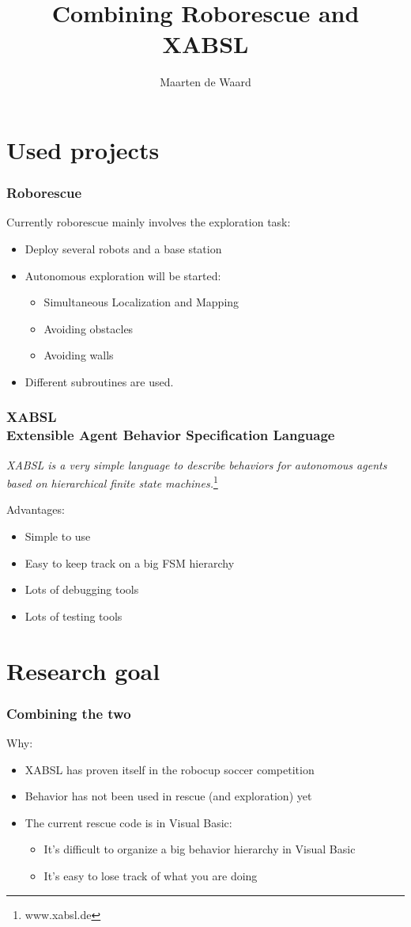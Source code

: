 \documentclass{beamer}
\title{Combining Roborescue and XABSL}
\author{Maarten de Waard}
\institute{UvA}
\newcommand{\slide}[2]
{
\begin{frame}
\frametitle{#1} 

#2

\end{frame}
}
\begin{document}
\begin{frame}
\titlepage
\end{frame}



\section{Used projects}
\slide{Roborescue}
{
    Currently roborescue mainly involves the exploration task:
\vspace{0.5cm}
\begin{itemize}
	\item Deploy several robots and a base station
	\item Autonomous exploration will be started:
	\begin{itemize}
		\item Simultaneous Localization and Mapping
		\item Avoiding obstacles
        \item Avoiding walls
    \end{itemize}
    \item Different subroutines are used.
\end{itemize}
}
\slide{XABSL\\\small Extensible Agent Behavior Specification Language}
{
   \textit{XABSL is a very simple language to describe behaviors for autonomous agents
   based on hierarchical finite state machines.}\footnote{www.xabsl.de}
    
    Advantages:
    \begin{itemize}
        \item Simple to use
        \item Easy to keep track on a big FSM hierarchy
        \item Lots of debugging tools
        \item Lots of testing tools
    \end{itemize}
}
\section{Research goal}
\slide{Combining the two}
{
Why:
\begin{itemize}
\item XABSL has proven itself in the robocup soccer competition
\item Behavior has not been used in rescue (and exploration) yet
\item The current rescue code is in Visual Basic: 
    \begin{itemize}
    \item It's difficult to organize a big behavior hierarchy in Visual Basic
    \item It's easy to lose track of what you are doing
    \end{itemize}
\end{itemize}
}
\end{document}
